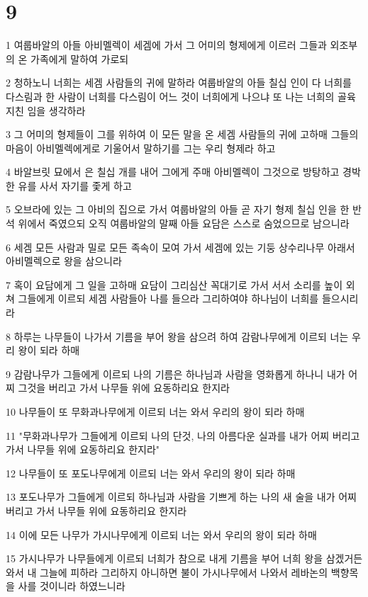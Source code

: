 \chapter{9}

\par 1 여룹바알의 아들 아비멜렉이 세겜에 가서 그 어미의 형제에게 이르러 그들과 외조부의 온 가족에게 말하여 가로되
\par 2 청하노니 너희는 세겜 사람들의 귀에 말하라 여룹바알의 아들 칠십 인이 다 너희를 다스림과 한 사람이 너희를 다스림이 어느 것이 너희에게 나으냐 또 나는 너희의 골육지친 임을 생각하라
\par 3 그 어미의 형제들이 그를 위하여 이 모든 말을 온 세겜 사람들의 귀에 고하매 그들의 마음이 아비멜렉에게로 기울어서 말하기를 그는 우리 형제라 하고
\par 4 바알브릿 묘에서 은 칠십 개를 내어 그에게 주매 아비멜렉이 그것으로 방탕하고 경박한 유를 사서 자기를 좇게 하고
\par 5 오브라에 있는 그 아비의 집으로 가서 여룹바알의 아들 곧 자기 형제 칠십 인을 한 반석 위에서 죽였으되 오직 여룹바알의 말째 아들 요담은 스스로 숨었으므로 남으니라
\par 6 세겜 모든 사람과 밀로 모든 족속이 모여 가서 세겜에 있는 기둥 상수리나무 아래서 아비멜렉으로 왕을 삼으니라
\par 7 혹이 요담에게 그 일을 고하매 요담이 그리심산 꼭대기로 가서 서서 소리를 높이 외쳐 그들에게 이르되 세겜 사람들아 나를 들으라 그리하여야 하나님이 너희를 들으시리라
\par 8 하루는 나무들이 나가서 기름을 부어 왕을 삼으려 하여 감람나무에게 이르되 너는 우리 왕이 되라 하매
\par 9 감람나무가 그들에게 이르되 나의 기름은 하나님과 사람을 영화롭게 하나니 내가 어찌 그것을 버리고 가서 나무들 위에 요동하리요 한지라
\par 10 나무들이 또 무화과나무에게 이르되 너는 와서 우리의 왕이 되라 하매
\par 11 "무화과나무가 그들에게 이르되 나의 단것, 나의 아름다운 실과를 내가 어찌 버리고 가서 나무들 위에 요동하리요 한지라"
\par 12 나무들이 또 포도나무에게 이르되 너는 와서 우리의 왕이 되라 하매
\par 13 포도나무가 그들에게 이르되 하나님과 사람을 기쁘게 하는 나의 새 술을 내가 어찌 버리고 가서 나무들 위에 요동하리요 한지라
\par 14 이에 모든 나무가 가시나무에게 이르되 너는 와서 우리의 왕이 되라 하매
\par 15 가시나무가 나무들에게 이르되 너희가 참으로 내게 기름을 부어 너희 왕을 삼겠거든 와서 내 그늘에 피하라 그리하지 아니하면 불이 가시나무에서 나와서 레바논의 백향목을 사를 것이니라 하였느니라
